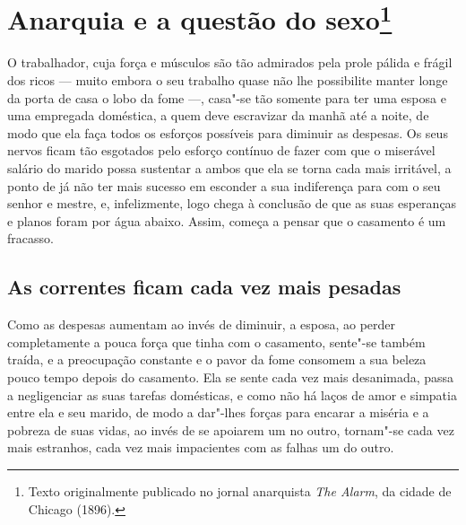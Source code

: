 










\chapter{Anarquia e a questão do sexo\footnote[*]{Texto originalmente publicado no
  jornal anarquista \emph{The Alarm}, da cidade de Chicago (1896).}}

O trabalhador, cuja força e músculos são tão admirados pela prole pálida
e frágil dos ricos --- muito embora o seu trabalho quase não lhe
possibilite manter longe da porta de casa o lobo da fome ---, casa"-se tão
somente para ter uma esposa e uma empregada doméstica, a quem deve
escravizar da manhã até a noite, de modo que ela faça todos os esforços
possíveis para diminuir as despesas. Os seus nervos ficam tão esgotados
pelo esforço contínuo de fazer com que o miserável salário do marido
possa sustentar a ambos que ela se torna cada mais irritável, a ponto de %
já não ter mais sucesso em esconder a sua indiferença para com o seu
senhor e mestre, e, infelizmente, logo chega à conclusão de que as suas %
esperanças e planos foram por água abaixo. Assim, começa a pensar que o
casamento é um fracasso.

\section{As correntes ficam cada vez mais pesadas}

Como as despesas aumentam ao invés de diminuir, a esposa, ao perder
completamente a pouca força que tinha com o casamento, sente"-se também
traída, e a preocupação constante e o pavor da fome consomem a sua
beleza pouco tempo depois do casamento. Ela se sente cada vez
mais desanimada, passa a negligenciar as suas tarefas domésticas, e como
não há laços de amor e simpatia entre ela e seu marido, de modo a
dar"-lhes forças para encarar a miséria e a pobreza de suas vidas, ao
invés de se apoiarem um no outro, tornam"-se cada vez mais estranhos,
cada vez mais impacientes com as falhas um do outro.

